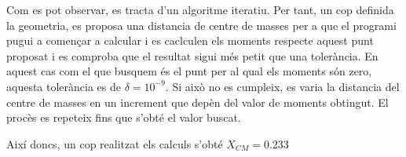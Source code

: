 Com es pot observar, es tracta d'un algoritme iteratiu. Per tant, un cop definida la geometria, es proposa una distancia de centre de masses per a que el programi pugui a començar a calcular i es caclculen els moments respecte aquest punt proposat i es comproba que el resultat sigui més petit que una tolerància. En aquest cas com el que busquem és el punt per al qual els moments són zero, aquesta tolerància es de $\delta=10^{-9}$. Si això no es cumpleix, es varia la distancia del centre de masses en un increment que depèn del valor de moments obtingut. El procès es repeteix fins que s'obté el valor buscat. 

Així doncs, un cop realitzat els calculs s'obté $X_{CM} = 0.233 $ 

